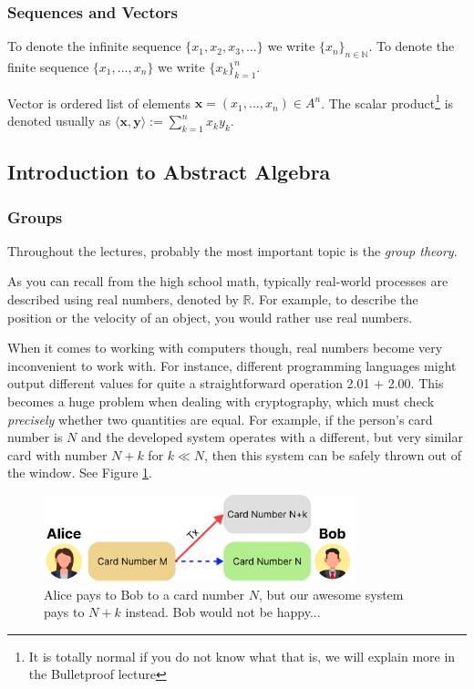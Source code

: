 \documentclass[../lecture-notes.tex]{subfiles}
\begin{document}
\subsubsection{Sequences and Vectors}

To denote the infinite sequence $\{x_1,x_2,x_3,\dots\}$ we write $\{x_n\}_{n \in \mathbb{N}}$. 
To denote the finite sequence $\{x_1,\dots,x_n\}$ we write $\{x_k\}_{k=1}^n$. 

Vector is ordered list of elements $\mathbf{x} = (x_1, \dots ,x_n) \in A^n$. The scalar product\footnote{It is totally normal if you do not know what that is, we will explain more in the Bulletproof lecture} is denoted usually 
as $\langle \mathbf{x}, \mathbf{y} \rangle := \sum_{k=1}^n x_ky_k$.

\subsection{Introduction to Abstract Algebra}

\subsubsection{Groups}

Throughout the lectures, probably the most important topic is the \textit{group theory}. 

As you can recall from the high school math, typically real-world processes are described using real numbers, denoted by $\mathbb{R}$. For example, to describe the position or the velocity of an object, you would rather use real numbers. 

When it comes to working with computers though, real numbers become very inconvenient to work with. For instance, different programming languages might output different values for quite a straightforward operation \textsf{2.01 + 2.00}. This becomes a huge problem when dealing with cryptography, which must check \textit{precisely} whether two quantities are equal. 
For example, if the person's card number is $N$ and the developed system operates with a different, but very similar card with number $N + k$ for $k \ll N$, then this system can be safely thrown out of the window. See Figure \ref{fig:why_integers}.

\begin{figure}[h!]
    \centering
    \includegraphics[width=0.8\textwidth]{images/lecture_1/why_integers.pdf}
    \caption{Alice pays to Bob to a card number $N$, but our awesome system pays to $N+k$ instead. Bob would not be happy...}
    \label{fig:why_integers}
\end{figure}
\end{document}
